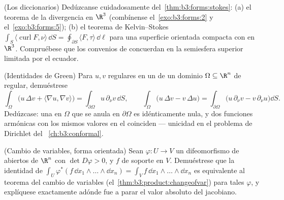 \begin{exercise}[$\star\star$]\label{exo:b3:forms:7}
(Los diccionarios) Dedúzcanse cuidadosamente
del~\cref{thm:b3:forms:stokes}: (a) el teorema de la divergencia en
$\R^3$ (combínense el~\cref{exo:b3:forms:2} y el~\cref{exo:b3:forms:5});
(b) el teorema de Kelvin--Stokes
$\int_S\langle\operatorname{curl}F, \nu\rangle\,\dd S =
\oint_{\partial S}\langle F, \tau\rangle\,\dd\ell$ para una superficie
orientada compacta con
 en $\R^3$. Compruébese que los
convenios de  concuerdan
en la semiesfera superior limitada por el ecuador.
\end{exercise}

\begin{exercise}[$\star\star$]\label{exo:b3:forms:8}
(Identidades de Green) Para $u, v$ regulares en un
 de un dominio
 $\Omega \subseteq \R^n$ de
 regular, demuéstrese
\[
\int_\Omega\bigl(u\,\Delta v + \langle\nabla u, \nabla
v\rangle\bigr) = \int_{\partial\Omega}u\,\partial_\nu
v\,\dd S,
\qquad
\int_\Omega\bigl(u\,\Delta v - v\,\Delta u\bigr) =
\int_{\partial\Omega}\bigl(u\,\partial_\nu v -
v\,\partial_\nu u\bigr)\dd S .
\]
Dedúzcase: una 
en $\Omega$ que se anula en $\partial\Omega$ es idénticamente nula, y
dos funciones armónicas con los
mismos valores en el  coinciden ---
unicidad en el problema de Dirichlet del~
\cref{ch:b3:conformal}.
\end{exercise}

\begin{exercise}[$\star\star$]\label{exo:b3:forms:9}
(Cambio de variables, forma orientada) Sean $\varphi\colon U
\to V$ un difeomorfismo de abiertos de $\R^n$ con $\det
D\varphi > 0$, y $f$  de
soporte  en $V$. Demuéstrese
que la identidad de 
$\int_U\varphi^*(f\,\dd x_1\wedge\dots\wedge\dd x_n) =
\int_Vf\,\dd x_1\wedge\dots\wedge\dd x_n$ es equivalente al teorema del
cambio de variables (el~\cref{thm:b3:product:changeofvar}) para tales
$\varphi$, y explíquese exactamente adónde fue a parar el valor absoluto
del jacobiano.
\end{exercise}

